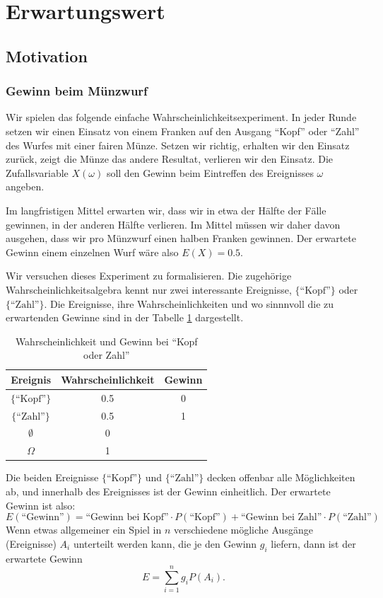 \section{Erwartungswert}
\label{section-erwartungswert}
\subsection{Motivation}
\subsubsection{Gewinn beim Münzwurf}
Wir spielen das folgende einfache Wahrscheinlichkeitsexperiment.
In jeder Runde setzen wir einen Einsatz von einem Franken auf den
Ausgang ``Kopf'' oder ``Zahl'' des Wurfes mit einer fairen Münze.
Setzen wir richtig, erhalten wir den Einsatz zurück, zeigt die
Münze das andere Resultat, verlieren wir den Einsatz.
Die Zufallsvariable
$X(\omega)$ soll den Gewinn beim Eintreffen des Ereignisses $\omega$
angeben.

Im
langfristigen Mittel erwarten wir, dass wir in etwa der Hälfte
der Fälle gewinnen, in der anderen Hälfte verlieren.
Im Mittel
müssen wir daher davon ausgehen, dass wir pro Münzwurf einen
halben Franken gewinnen.
Der erwartete Gewinn einem einzelnen
Wurf wäre also $E(X)=0.5$.

Wir versuchen dieses Experiment zu formalisieren.
Die zugehörige
Wahrscheinlichkeitsalgebra kennt nur zwei interessante Ereignisse,
$\{\text{``Kopf''}\}$ oder $\{\text{``Zahl''}\}$.
Die Ereignisse, ihre Wahrscheinlichkeiten und wo sinnnvoll
die zu erwartenden Gewinne sind
in der Tabelle \ref{kopfzahlwahrscheinlichkeit} dargestellt.
\begin{table}
\begin{center}
\begin{tabular}{|c|c|c|}
\hline
Ereignis&Wahrscheinlichkeit&Gewinn\\
\hline
$\{\text{``Kopf''}\}$&0.5&0\\
$\{\text{``Zahl''}\}$&0.5&1\\
$\emptyset$&0&\\
$\Omega$&1&\\
\hline
\end{tabular}
\end{center}
\caption{Wahrscheinlichkeit und Gewinn bei ``Kopf oder Zahl''
\label{kopfzahlwahrscheinlichkeit}}
\end{table}
Die beiden Ereignisse $\{\text{``Kopf''}\}$ und $\{\text{``Zahl''}\}$
decken offenbar alle Möglichkeiten ab, und innerhalb des Ereignisses
ist der Gewinn einheitlich.
Der erwartete Gewinn ist also:
\[
E(\text{``Gewinn''})=\text{``Gewinn bei Kopf''}\cdot P(\text{``Kopf''})
+\text{``Gewinn bei Zahl''}\cdot P(\text{``Zahl''})
\]
Wenn etwas allgemeiner ein Spiel in $n$ verschiedene mögliche
Ausgänge (Ereignisse) $A_i$ unterteilt werden kann, die je den
Gewinn $g_i$ liefern, dann ist der erwartete Gewinn
\[
E=\sum_{i=1}^{n}g_iP(A_i).
\]

